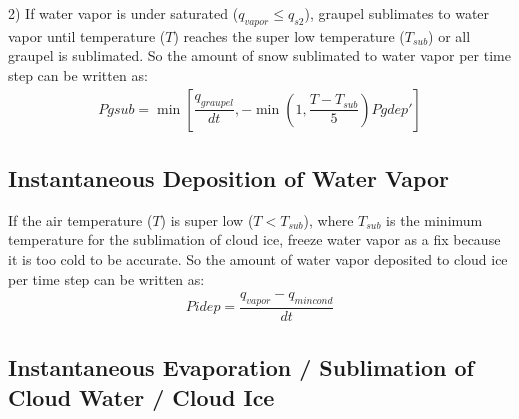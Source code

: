 \documentclass[letterpaper,titlepage,10pt]{article}
\numberwithin{equation}{section}
\begin{document}
2) If water vapor is under saturated ($q_{vapor} \leq q_{s2}$), graupel sublimates to water vapor until temperature ($T$) reaches the super low temperature ($T_{sub}$) or all graupel is sublimated. So the amount of snow sublimated to water vapor per time step can be written as:
\begin{gather}
	Pgsub = \min \left[\dfrac{q_{graupel}}{dt}, - \min \left(1, \dfrac{T - T_{sub}}{5} \right) Pgdep' \right]
\end{gather}


\subsection{Instantaneous Deposition of Water Vapor}

If the air temperature ($T$) is super low ($T < T_{sub}$), where $T_{sub}$ is the minimum temperature for the sublimation of cloud ice, freeze water vapor as a fix because it is too cold to be accurate. So the amount of water vapor deposited to cloud ice per time step can be written as:
\begin{gather}
	Pidep = \dfrac{q_{vapor} - q_{mincond}}{dt}
\end{gather}


\subsection{Instantaneous Evaporation / Sublimation of Cloud Water / Cloud Ice}
\end{document}
